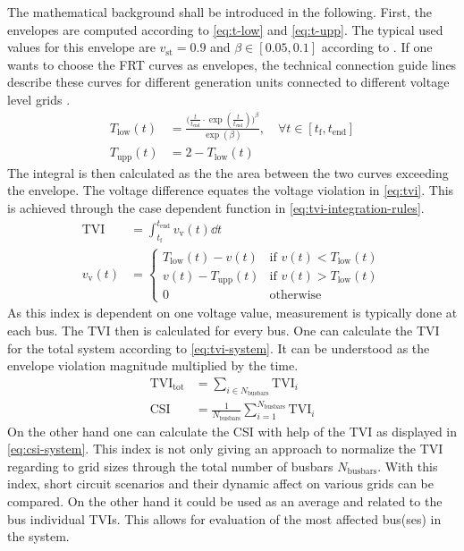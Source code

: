 The mathematical background shall be introduced in the following.
First, the envelopes are computed according to \autoref{eq:t-low} and \autoref{eq:t-upp}.
The typical used values for this envelope are $v_\mathrm{st}=0.9$ and $\beta \in [0.05,0.1]$ according to \textcite{wildenhues_2015}.
If one wants to choose the \acs{FRT} curves as envelopes, the technical connection guide lines describe these curves for different generation units connected to different voltage level grids \autocite{vde-tar_2018,vde-tar_2023}.
\begin{align}
    T_\mathrm{low}(t) &= \frac{\bigg(\frac{t}{t_\mathrm{end}} \cdot \exp(\frac{t}{t_\mathrm{end}})\bigg)^\beta}{\exp(\beta)},\quad \forall t \in [t_\mathrm{f}, t_\mathrm{end}] \label{eq:t-low} \\[12pt]
    T_\mathrm{upp}(t) &= 2-T_\mathrm{low}(t) \label{eq:t-upp}
\end{align}
The integral is then calculated as the the area between the two curves exceeding the envelope.
The voltage difference equates the voltage violation in \autoref{eq:tvi}.
This is achieved through the case dependent function in \autoref{eq:tvi-integration-rules}.
\begin{align}
    \text{TVI} &= \int_{t_\mathrm{f}}^{t_\mathrm{end}} v_\mathrm{v}(t) \dd{t} \label{eq:tvi}\\[12pt]
    v_\mathrm{v}(t) &= \begin{cases}
            T_\mathrm{low}(t) - v(t) & \text{if } v(t) < T_\mathrm{low}(t)\\
            v(t) - T_\mathrm{upp}(t) & \text{if } v(t) > T_\mathrm{low}(t)\\
            0 & \text{otherwise}
    \end{cases} \label{eq:tvi-integration-rules}
\end{align}
As this index is dependent on one voltage value, measurement is typically done at each bus.
The \acs{TVI} then is calculated for every bus.
One can calculate the \acs{TVI} for the total system according to \autoref{eq:tvi-system}.
It can be understood as the envelope violation magnitude multiplied by the time.
\begin{align}
    \text{TVI}_\mathrm{tot} &= \sum_{i \in N_\mathrm{busbars}} \text{TVI}_i \label{eq:tvi-system} \\[12pt]
    \text{CSI} &= \frac{1}{N_\mathrm{busbars}} \sum_{i=1}^{N_\mathrm{busbars}} \text{TVI}_i \label{eq:csi-system}
\end{align}
On the other hand one can calculate the \ac{CSI} with help of the \acs{TVI} as displayed in \autoref{eq:csi-system}.
This index is not only giving an approach to normalize the \acs{TVI} regarding to grid sizes through the total number of busbars $N_\mathrm{busbars}$.
With this index, short circuit scenarios and their dynamic affect on various grids can be compared.
On the other hand it could be used as an average and related to the bus individual \acsp{TVI}.
This allows for evaluation of the most affected bus(ses) in the system.

